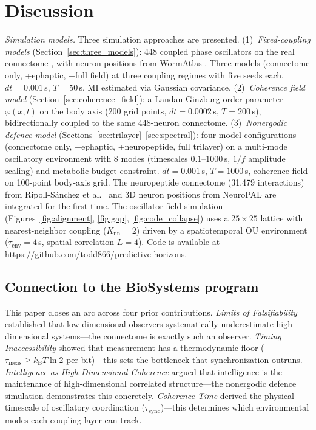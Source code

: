 \documentclass[12pt]{article}
\newcommand{\kB}{k_{\mathrm{B}}}
\newcommand{\tsync}{\tau_{\mathrm{sync}}}
\newcommand{\tenv}{\tau_{\mathrm{env}}}
\newcommand{\tmeas}{\tau_{\mathrm{meas}}}
\begin{document}
\section{Discussion}
\label{sec:discussion}

\textit{Simulation models.} Three simulation approaches are presented. (1)~\textit{Fixed-coupling models} (Section~\ref{sec:three_models}): 448 coupled phase oscillators on the real connectome \cite{varshney2011}, with neuron positions from WormAtlas \cite{altun2024}. Three models (connectome only, +ephaptic, +full field) at three coupling regimes with five seeds each. $dt = 0.001$\,s, $T = 50$\,s, MI estimated via Gaussian covariance. (2)~\textit{Coherence field model} (Section~\ref{sec:coherence_field}): a Landau-Ginzburg order parameter $\varphi(x,t)$ on the body axis (200 grid points, $dt = 0.0002$\,s, $T = 200$\,s), bidirectionally coupled to the same 448-neuron connectome. (3)~\textit{Nonergodic defence model} (Sections~\ref{sec:trilayer}--\ref{sec:spectral}): four model configurations (connectome only, +ephaptic, +neuropeptide, full trilayer) on a multi-mode oscillatory environment with 8 modes (timescales $0.1$--$1000$\,s, $1/f$ amplitude scaling) and metabolic budget constraint. $dt = 0.001$\,s, $T = 1000$\,s, coherence field on 100-point body-axis grid. The neuropeptide connectome (31{,}479 interactions) from Ripoll-S\'anchez et al.\ \cite{ripollsanchez2023} and 3D neuron positions from NeuroPAL \cite{yemini2021} are integrated for the first time. The oscillator field simulation (Figures~\ref{fig:alignment}, \ref{fig:gap}, \ref{fig:code_collapse}) uses a $25 \times 25$ lattice with nearest-neighbor coupling ($K_{\mathrm{nn}} = 2$) driven by a spatiotemporal OU environment ($\tenv = 4$\,s, spatial correlation $L = 4$). Code is available at \url{https://github.com/todd866/predictive-horizons}.

\subsection{Connection to the BioSystems program}
\label{sec:connection}

This paper closes an arc across four prior contributions. \textit{Limits of Falsifiability} \cite{todd2025falsifiability} established that low-dimensional observers systematically underestimate high-dimensional systems---the connectome is exactly such an observer. \textit{Timing Inaccessibility} \cite{todd2025demon} showed that measurement has a thermodynamic floor ($\tmeas \geq \kB T \ln 2$ per bit)---this sets the bottleneck that synchronization outruns. \textit{Intelligence as High-Dimensional Coherence} \cite{todd2025intelligence} argued that intelligence is the maintenance of high-dimensional correlated structure---the nonergodic defence simulation demonstrates this concretely. \textit{Coherence Time} \cite{todd2026coherence} derived the physical timescale of oscillatory coordination ($\tsync$)---this determines which environmental modes each coupling layer can track.
\end{document}
